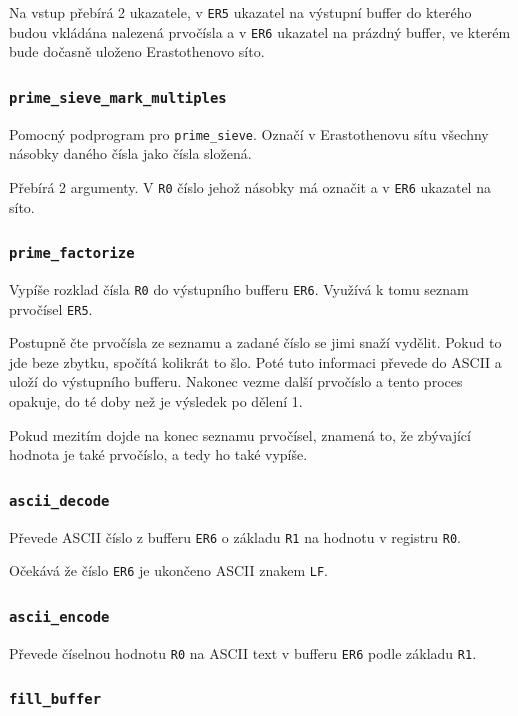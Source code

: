 \documentclass[12pt]{article}
\newcommand{\code}[1]{\mbox{\texttt{#1}}}
\begin{document}
Na vstup přebírá 2 ukazatele, v \code{ER5} ukazatel na výstupní buffer do
kterého budou vkládána nalezená prvočísla a v \code{ER6} ukazatel na prázdný
buffer, ve kterém bude dočasně uloženo Erastothenovo síto.

\subsubsection{\code{prime\_sieve\_mark\_multiples}}

Pomocný podprogram pro \code{prime\_sieve}. Označí v Erastothenovu sítu všechny násobky daného
čísla jako čísla složená.

Přebírá 2 argumenty. V \code{R0} číslo jehož násobky má označit a v \code{ER6} ukazatel na síto.

\subsubsection{\code{prime\_factorize}}

Vypíše rozklad čísla \code{R0} do výstupního bufferu \code{ER6}. Využívá k tomu seznam prvočísel
\code{ER5}.

Postupně čte prvočísla ze seznamu a zadané číslo se jimi snaží vydělit. Pokud
to jde beze zbytku, spočítá kolikrát to šlo. Poté tuto informaci převede do
ASCII a uloží do výstupního bufferu. Nakonec vezme další prvočíslo a tento
proces opakuje, do té doby než je výsledek po dělení 1.

Pokud mezitím dojde na konec seznamu prvočísel, znamená to, že zbývající
hodnota je také prvočíslo, a tedy ho také vypíše.

\subsubsection{\code{ascii\_decode}}

Převede ASCII číslo z bufferu \code{ER6} o základu \code{R1} na hodnotu v
registru \code{R0}.

Očekává že číslo \code{ER6} je ukončeno ASCII znakem \code{LF}.

\subsubsection{\code{ascii\_encode}}

Převede číselnou hodnotu \code{R0} na ASCII text v bufferu \code{ER6} podle
základu \code{R1}.

\subsubsection{\code{fill\_buffer}}
\end{document}
